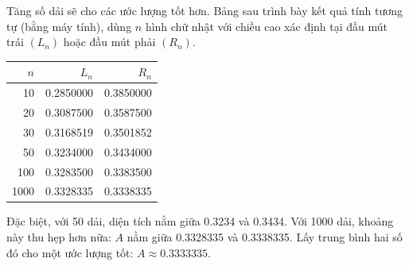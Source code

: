 \documentclass[12pt,a4paper]{article}
\begin{document}
Tăng số dải sẽ cho các ước lượng tốt hơn. Bảng sau trình bày kết quả tính tương tự (bằng máy tính), dùng $n$ hình chữ nhật với chiều cao xác định tại đầu mút trái $(L_n)$ hoặc đầu mút phải $(R_n)$.
\begin{center}\begin{tabular}{rrr}\toprule
$n$&$L_n$&$R_n$\\\midrule
10&0.2850000&0.3850000\\20&0.3087500&0.3587500\\30&0.3168519&0.3501852\\50&0.3234000&0.3434000\\100&0.3283500&0.3383500\\1000&0.3328335&0.3338335\\\bottomrule
\end{tabular}\end{center}
Đặc biệt, với 50 dải, diện tích nằm giữa 0.3234 và 0.3434. Với 1000 dải, khoảng này thu hẹp hơn nữa: $A$ nằm giữa 0.3328335 và 0.3338335. Lấy trung bình hai số đó cho một ước lượng tốt: $A\approx0.3333335$.
\end{document}
